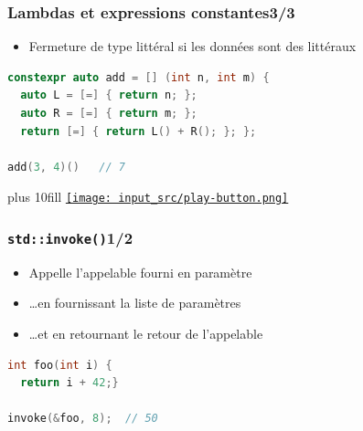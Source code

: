 \documentclass[C++.tex]{subfiles}
\begin{document}
\begin{frame}[fragile]
	\frametitle{Lambdas et expressions constantes\titlehfill{}3/3}
	\begin{itemize}
		\item Fermeture de type littéral si les données sont des littéraux
	\end{itemize}

	\begin{lstlisting}[language=C++]
constexpr auto add = [] (int n, int m) {
  auto L = [=] { return n; };
  auto R = [=] { return m; };
  return [=] { return L() + R(); }; };

add(3, 4)()   // 7\end{lstlisting}

	\vskip 10mm plus 10fill
	\hfill
	\href{https://godbolt.org/#z:OYLghAFBqd5QCxAYwPYBMCmBRdBLAF1QCcAaPECAMzwBtMA7AQwFtMQByARg9KtQYEAysib0QXACx8BBAKoBnTAAUAHpwAMvAFYTStJg1DIApACYAQuYukl9ZATwDKjdAGFUtAK4sGe1wAyeAyYAHI%2BAEaYxCAAzABspAAOqAqETgwe3r56KWmOAkEh4SxRMQm2mPYFDEIETMQEWT5%2BXJXVGXUNBEVhkdFxiQr1jc05bcPdvSVlgwCUtqhexMjsHOaxwcjeWADUJrFuTsPEmKwH2CYaAIJX12gMw5iqScS7wQS71%2Bjo2PQAbowIB9dgw5ncTAB2Kw3Xa7U4EZYMfYAVgsDBMKIAIvtofDMIjiMiMZYuFwDhZcViIODYjDbpCsRCbiCWExgjSIdC7nCofS4XDhugQCglp8Dm4JV8fn9MICGBAUXN9ocpWB1ii3Ax1RSeVTmddedzYQKmF4iLsAJI4g42tGYnHAwSg5UPJ4vN58/GE4kU/V0vVwt0EZ6vd7Oy0qnHWiCxWn8gVCkVoc0qyWHK1ptUarU6gMmqFMm56vmB3Zmi3WqOoqzY3ZOz5g3GUhFI0F%2Bwu6k1BgTusMgyO2q3UuNdw2JgjC0WpiVSweqjM6zXa9b58ed4sF43jnuPEMe8vm1Dln7VzG1x0ghikcOfFjg7sCp/Pl%2Bv0uP1%2Bfr9wivHgJn%2B1YiZOsvVbIl2zpf0E2/GDX1/XYACUAKsICHWbb02xYDtGTHWC8OfMDkXPW00NAgk2wCGl9ksRDOUgzs13w/CGOg3Yk2ncUFzcE90FjG9JDmKjZ0XHMV1w/Vixwm4OAWWhOBRXg/A4LRSFQThJUsaw2KWFZMGo2IeFIAhNBkhYAGsQBRDR9E4SRFJM1TOF4BQQGs4zlJk0g4FgJBnkwZAjzICgIAaYAFGUQwqiEBBUAAdyUwy0BYJI6CYGoIpCWhoripSVKSlL6BiYAyTMUh8roaIAHlzWy%2BKHL85BrmIMKnNIBq6nwJTeH4QQRDEdgpBkQRFBUdQPNIXQ2gMIwUGsax9DwCIXNgZg2BACJUFSAhSEBGJuEhBS5gWVAkhqFyOAAWiFW1TE00lIWcnTVj0IVggyqKYrq7heAIU41kM2LiCYJITNk%2BT7PGtSOGwVR/MC3ZVAADniC74kkXZgGQZBdjJAA6Mx6w0qxLBvXBCBIfSuDmH7QYWBAziwGIaVICyrJsjg7NIXLeCh5zXKM2n2bMCGVN5gWPKOnbojSZxJCAA%3D}{\texttt{[image: input\_src/play-button.png]}}
\end{frame}

\begin{frame}[fragile]
	\frametitle{\lstinline|std::invoke()|\titlehfill{}1/2}
	\begin{itemize}
		\item Appelle l'appelable fourni en paramètre
		\item \ldots en fournissant la liste de paramètres
		\item \ldots et en retournant le retour de l'appelable
	\end{itemize}

	\begin{lstlisting}[language=C++]
int foo(int i) {
  return i + 42;}

invoke(&foo, 8);  // 50\end{lstlisting}
\end{frame}
\end{document}
